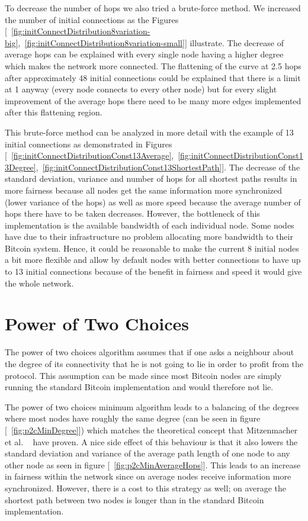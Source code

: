 \documentclass[a4paper, oneside]{discothesis}
\begin{document}
To decrease the number of hops we also tried a brute-force method. We increased the number of initial connections as the Figures [~\ref{fig:initConnectDistribution8variation-big},~\ref{fig:initConnectDistribution8variation-small}] illustrate. The decrease of average hops can be explained with every single node having a higher degree which makes the network more connected. The flattening of the curve at 2.5 hops after approximately 48 initial connections could be explained that there is a limit at 1 anyway (every node connects to every other node) but for every slight improvement of the average hops there need to be many more edges implemented after this flattening region.

This brute-force method can be analyzed in more detail with the example of 13 initial connections as demonstrated in Figures [~\ref{fig:initConnectDistributionConst13Average},~\ref{fig:initConnectDistributionConst13Degree},~\ref{fig:initConnectDistributionConst13ShortestPath}]. The decrease of the standard deviation, variance and number of hops for all shortest paths results in more fairness because all nodes get the same information more synchronized (lower variance of the hops) as well as more speed because the average number of hops there have to be taken decreases.
However, the bottleneck of this implementation is the available bandwidth of each individual node.
Some nodes have due to their infrastructure no problem allocating more bandwidth to their Bitcoin system. Hence, it could be reasonable to make the current 8 initial nodes a bit more flexible and allow by default nodes with better connections to have up to 13 initial connections because of the benefit in fairness and speed it would give the whole network.

\section{Power of Two Choices}

The power of two choices algorithm assumes that if one asks a neighbour about the degree of its connectivity that he is not going to lie in order to profit from the protocol. This assumption can be made since most Bitcoin nodes are simply running the standard Bitcoin implementation and would therefore not lie.

The power of two choices minimum algorithm leads to a balancing of the degrees where most nodes have roughly the same degree (can be seen in figure [~\ref{fig:p2cMinDegree}]) which matches the theoretical concept that Mitzenmacher et al. ~\cite{Power2Choices} have proven.
A nice side effect of this behaviour is that it also lowers the standard deviation and variance of the average path length of one node to any other node as seen in figure [~\ref{fig:p2cMinAverageHops}]. This leads to an increase in fairness within the network since on average nodes receive information more synchronized. However, there is a cost to this strategy as well; on average the shortest path between two nodes is longer than in the standard Bitcoin implementation.
\end{document}
